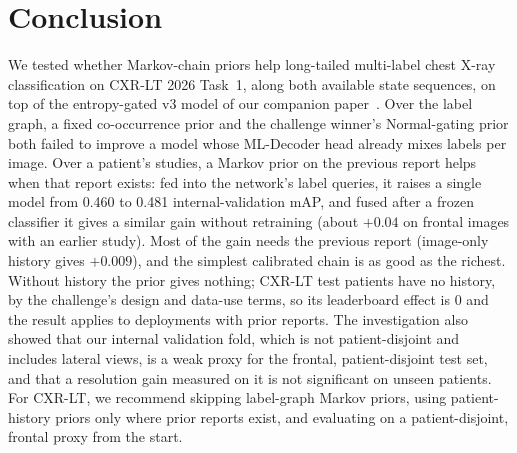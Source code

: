\documentclass[conference]{IEEEtran}
\begin{document}
\section{Conclusion}
We tested whether Markov-chain priors help long-tailed multi-label chest X-ray classification on CXR-LT 2026 Task~1, along both available state sequences, on top of the entropy-gated v3 model of our companion paper~\cite{b25}. Over the label graph, a fixed co-occurrence prior and the challenge winner's Normal-gating prior both failed to improve a model whose ML-Decoder head already mixes labels per image. Over a patient's studies, a Markov prior on the previous report helps when that report exists: fed into the network's label queries, it raises a single model from 0.460 to 0.481 internal-validation mAP, and fused after a frozen classifier it gives a similar gain without retraining (about $+0.04$ on frontal images with an earlier study). Most of the gain needs the previous report (image-only history gives $+0.009$), and the simplest calibrated chain is as good as the richest. Without history the prior gives nothing; CXR-LT test patients have no history, by the challenge's design and data-use terms, so its leaderboard effect is 0 and the result applies to deployments with prior reports. The investigation also showed that our internal validation fold, which is not patient-disjoint and includes lateral views, is a weak proxy for the frontal, patient-disjoint test set, and that a resolution gain measured on it is not significant on unseen patients. For CXR-LT, we recommend skipping label-graph Markov priors, using patient-history priors only where prior reports exist, and evaluating on a patient-disjoint, frontal proxy from the start.

\appendix
\end{document}
